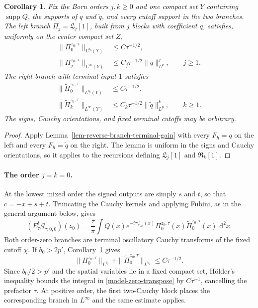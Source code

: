 \documentclass[a4paper,11pt]{article}
\newcommand{\dd}{\,\text{d}}
\theoremstyle{plain}
\newtheorem{cor}[thm]{Corollary}
\theoremstyle{definition}
\theoremstyle{remark}
\begin{document}
\begin{cor}
\label{cor-reverse-born-branch-gains}
Fix the Born orders $j,k\geq0$ and one compact set $Y$ containing
$\operatorname{supp}Q$, the supports of $q$ and $\widetilde q$, and every
cutoff support in the two branches. The left branch $\Pi_j=\mathfrak L_j[1]$, built from $j$
blocks with coefficient $q$, satisfies, uniformly on the center compact set
$Z$,
\begin{align}
 \|\Pi_0^{z_0,\tau}\|_{L^{b_0}(Y)}
 &\leq C\tau^{-1/2},
 \label{reverse-left-zero-gain}\\
 \|\Pi_j^{z_0,\tau}\|_{L^\infty(Y)}
 &\leq C_j\tau^{-1/2}\|q\|_{L^p}^j,
 \qquad j\geq1.
 \label{reverse-left-positive-gain}
\end{align}
The right branch with terminal input $1$ satisfies
\begin{align}
 \|\widetilde\Pi_0^{z_0,\tau}\|_{L^{b_0}(Y)}
 &\leq C\tau^{-1/2},
 \label{reverse-right-zero-gain}\\
 \|\widetilde\Pi_k^{z_0,\tau}\|_{L^\infty(Y)}
 &\leq C_k\tau^{-1/2}\|\widetilde q\|_{L^p}^k,
 \qquad k\geq1.
 \label{reverse-right-positive-gain}
\end{align}
The signs, Cauchy orientations, and fixed terminal cutoffs may be arbitrary.
\end{cor}

\begin{proof}
Apply Lemma~\ref{lem-reverse-branch-terminal-gain} with every $F_h=q$ on the left and
every $F_h=\widetilde q$ on the right.  The lemma is uniform in the signs and
Cauchy orientations, so it applies to the recursions defining
$\mathfrak L_j[1]$ and $\mathfrak R_k[1]$.
\end{proof}


\paragraph{The order $j=k=0$.}
At the lowest mixed order the signed outputs are simply $s$ and $t$, so that $c=-x+s+t$.  Truncating the Cauchy kernels and applying Fubini, as in the general argument below, gives
\begin{equation}\label{model-zero-transpose}
 (E_\tau^t\mathcal G_{\tau,0,0})(z_0)
 =\frac{\tau}{\pi}\int Q(x)e^{-i\tau\psi_{z_0}(x)}
 \Pi_0^{z_0,\tau}(x)\widetilde\Pi_0^{z_0,\tau}(x)\,\dd^2x.
\end{equation}
Both order-zero branches are terminal oscillatory Cauchy transforms of the fixed cutoff $\chi$.  If $b_0>2p'$, Corollary~\ref{cor-reverse-born-branch-gains} gives
\[
 \|\Pi_0^{z_0,\tau}\|_{L^{b_0}}
 +\|\widetilde\Pi_0^{z_0,\tau}\|_{L^{b_0}}
 \leq C\tau^{-1/2}.
\]
Since $b_0/2>p'$ and the spatial variables lie in a fixed compact set, H\"older's inequality bounds the integral in \eqref{model-zero-transpose} by $C\tau^{-1}$, cancelling the prefactor $\tau$.  At positive order, the first two-Cauchy block places the corresponding branch in $L^\infty$ and the same estimate applies.
\end{document}

